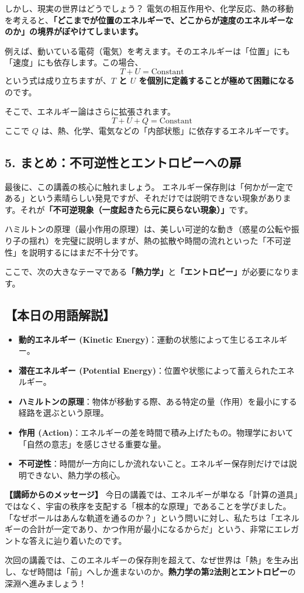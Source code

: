 \documentclass[a4paper,11pt,openany]{ltjsbook}
\begin{document}
\begin{lecturebox}
しかし、現実の世界はどうでしょう？
電気の相互作用や、化学反応、熱の移動を考えると、\textbf{「どこまでが位置のエネルギーで、どこからが速度のエネルギーなのか」の境界がぼやけてしまいます。}

例えば、動いている電荷（電気）を考えます。そのエネルギーは「位置」にも「速度」にも依存します。この場合、
$$T + U = \text{Constant}$$
という式は成り立ちますが、\textbf{$T$ と $U$ を個別に定義することが極めて困難になる}のです。

そこで、エネルギー論はさらに拡張されます。
$$T + U + Q = \text{Constant}$$
ここで $Q$ は、熱、化学、電気などの「内部状態」に依存するエネルギーです。

\subsection*{5. まとめ：不可逆性とエントロピーへの扉}

最後に、この講義の核心に触れましょう。
エネルギー保存則は「何かが一定である」という素晴らしい発見ですが、それだけでは説明できない現象があります。それが\textbf{「不可逆現象（一度起きたら元に戻らない現象）」}です。

ハミルトンの原理（最小作用の原理）は、美しい可逆的な動き（惑星の公転や振り子の揺れ）を完璧に説明しますが、熱の拡散や時間の流れといった「不可逆性」を説明するにはまだ不十分です。

ここで、次の大きなテーマである\textbf{「熱力学」}と\textbf{「エントロピー」}が必要になります。

\subsection*{【本日の用語解説】}
\begin{itemize}[leftmargin=2em]
\item \textbf{動的エネルギー (Kinetic Energy)}：運動の状態によって生じるエネルギー。
\item \textbf{潜在エネルギー (Potential Energy)}：位置や状態によって蓄えられたエネルギー。
\item \textbf{ハミルトンの原理}：物体が移動する際、ある特定の量（作用）を最小にする経路を選ぶという原理。
\item \textbf{作用 (Action)}：エネルギーの差を時間で積み上げたもの。物理学において「自然の意志」を感じさせる重要な量。
\item \textbf{不可逆性}：時間が一方向にしか流れないこと。エネルギー保存則だけでは説明できない、熱力学の核心。
\end{itemize}

\textbf{【講師からのメッセージ】}
今日の講義では、エネルギーが単なる「計算の道具」ではなく、宇宙の秩序を支配する「根本的な原理」であることを学びました。
「なぜボールはあんな軌道を通るのか？」という問いに対し、私たちは「エネルギーの合計が一定であり、かつ作用が最小になるからだ」という、非常にエレガントな答えに辿り着いたのです。

次回の講義では、このエネルギーの保存則を超えて、なぜ世界は「熱」を生み出し、なぜ時間は「前」へしか進まないのか。\textbf{熱力学の第2法則とエントロピー}の深淵へ進みましょう！
\end{lecturebox}
\end{document}
